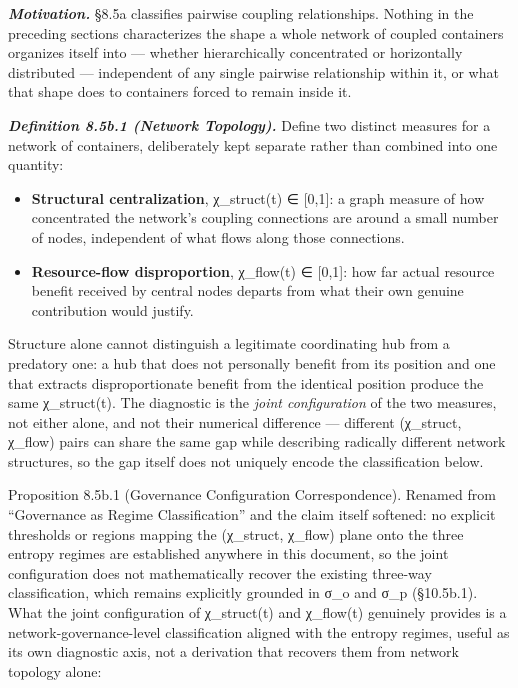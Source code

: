 \documentclass[
]{article}
\begin{document}
\emph{\textbf{Motivation.}} §8.5a classifies pairwise coupling
relationships. Nothing in the preceding sections characterizes the shape
a whole network of coupled containers organizes itself into --- whether
hierarchically concentrated or horizontally distributed --- independent
of any single pairwise relationship within it, or what that shape does
to containers forced to remain inside it.

\emph{\textbf{Definition 8.5b.1 (Network Topology).}} Define two
distinct measures for a network of containers, deliberately kept
separate rather than combined into one quantity:

\begin{itemize}
\item
  \textbf{Structural centralization}, χ\_struct(t) ∈ {[}0,1{]}: a graph
  measure of how concentrated the network's coupling connections are
  around a small number of nodes, independent of what flows along those
  connections.
\item
  \textbf{Resource-flow disproportion}, χ\_flow(t) ∈ {[}0,1{]}: how far
  actual resource benefit received by central nodes departs from what
  their own genuine contribution would justify.
\end{itemize}

Structure alone cannot distinguish a legitimate coordinating hub from a
predatory one: a hub that does not personally benefit from its position
and one that extracts disproportionate benefit from the identical
position produce the same χ\_struct(t). The diagnostic is the
\emph{joint configuration} of the two measures, not either alone, and
not their numerical difference --- different (χ\_struct, χ\_flow) pairs
can share the same gap while describing radically different network
structures, so the gap itself does not uniquely encode the
classification below.

Proposition 8.5b.1 (Governance Configuration Correspondence). Renamed
from ``Governance as Regime Classification'' and the claim itself
softened: no explicit thresholds or regions mapping the (χ\_struct,
χ\_flow) plane onto the three entropy regimes are established anywhere
in this document, so the joint configuration does not mathematically
recover the existing three-way classification, which remains explicitly
grounded in σ\_o and σ\_p (§10.5b.1). What the joint configuration of
χ\_struct(t) and χ\_flow(t) genuinely provides is a
network-governance-level classification aligned with the entropy
regimes, useful as its own diagnostic axis, not a derivation that
recovers them from network topology alone:
\end{document}

